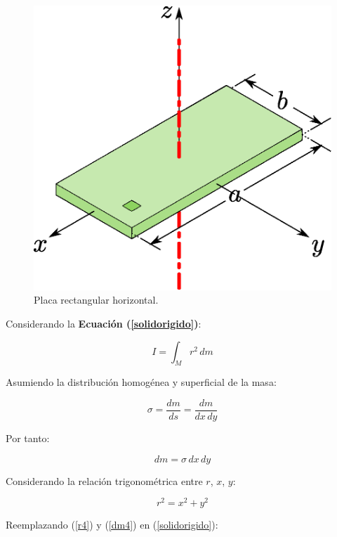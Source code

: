 \documentclass[letter,oneside,11pt]{article}
\begin{document}
\begin{figure}
\centering
\includegraphics[scale=0.5]{resources/f9.eps}
\caption{Placa rectangular horizontal.}
\label{figura9}
\end{figure}

Considerando la \textbf{Ecuación (\ref{solidorigido})}:

\begin{equation*}
    I = \int_{M} r^2\, dm
\tag{4}
\end{equation*}

Asumiendo la distribución homogénea y superficial de la masa:

\begin{equation*}
    \sigma = \frac{dm}{ds} = \frac{dm}{dx\, dy}
\end{equation*}

Por tanto:

\begin{equation}
    dm = \sigma\, dx\, dy
\label{dm4}
\end{equation}

Considerando la relación trigonométrica entre $r$, $x$, $y$:

\begin{equation}
    r^2 = x^2 + y^2
\label{r4}
\end{equation}

Reemplazando (\ref{r4}) y (\ref{dm4}) en (\ref{solidorigido}):
\end{document}
